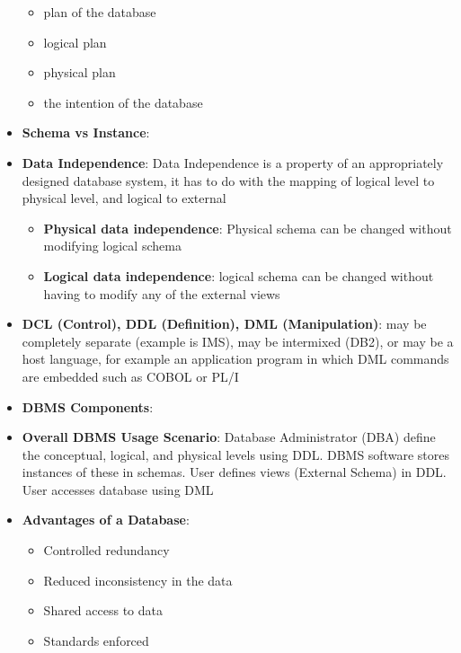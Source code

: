 \documentclass{report}
\begin{document}
\begin{itemize}
            \begin{itemize}
                \item plan of the database
                \item logical plan
                \item physical plan
                \item the intention of the database
            \end{itemize}
        \item \textbf{Schema vs Instance}:
            \bigbreak \noindent 
        \item \textbf{Data Independence}: Data Independence is a property of an appropriately designed database system,  it has to do with the mapping of logical level to physical level, and logical to external
            \begin{itemize}
                \item \textbf{Physical data independence}:  Physical schema can be changed without modifying logical schema
                \item \textbf{Logical data independence}: logical schema can be changed without having to modify any of the external views
            \end{itemize}
        \item \textbf{DCL (Control), DDL (Definition), DML (Manipulation)}: may be completely separate (example is IMS), may be intermixed (DB2), or may be a host language, for example an  application program in which DML commands are embedded such as COBOL or PL/I
        \item \textbf{DBMS Components}:
            \bigbreak \noindent 
        \item \textbf{Overall DBMS Usage Scenario}: Database Administrator (DBA) define the conceptual, logical, and physical levels using DDL.  DBMS software stores instances of these in schemas.  User defines views (External Schema) in DDL. User accesses database using DML
        \item \textbf{Advantages of a Database}:
            \begin{itemize}
                \item Controlled redundancy
                \item Reduced inconsistency in the data
                \item Shared access to data
                \item Standards enforced

\end{itemize}
\end{itemize}
\end{document}

